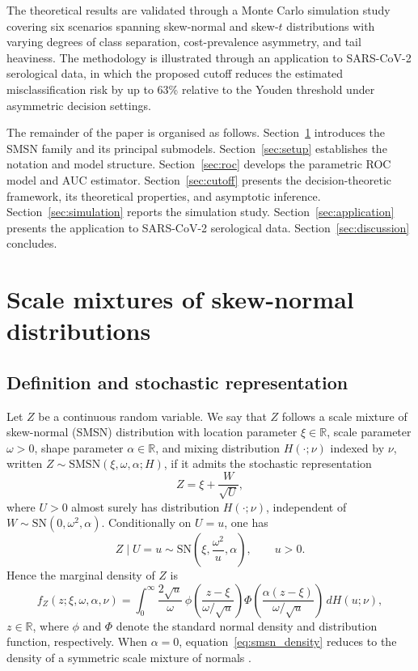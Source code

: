 \documentclass[11pt,a4paper]{article}
\theoremstyle{definition}
\theoremstyle{remark}
\newcommand{\1}{\mathbf{1}}
\begin{document}
\smallskip

The theoretical results are validated through a Monte Carlo simulation
study covering six scenarios spanning skew-normal and skew-$t$
distributions with varying degrees of class separation, cost-prevalence
asymmetry, and tail heaviness. The methodology is illustrated through an
application to SARS-CoV-2 serological data, in which the proposed
cutoff reduces the estimated misclassification risk by up to 63\%
relative to the Youden threshold under asymmetric decision settings.

The remainder of the paper is organised as follows.
Section~\ref{sec:smsn} introduces the SMSN family and its principal
submodels. Section~\ref{sec:setup} establishes the notation and model
structure. Section~\ref{sec:roc} develops the parametric ROC model and
AUC estimator. Section~\ref{sec:cutoff} presents the decision-theoretic
framework, its theoretical properties, and asymptotic inference.
Section~\ref{sec:simulation} reports the simulation study.
Section~\ref{sec:application} presents the application to SARS-CoV-2
serological data. Section~\ref{sec:discussion} concludes.

\section{Scale mixtures of skew-normal distributions}
\label{sec:smsn}

\subsection{Definition and stochastic representation}

Let $Z$ be a continuous random variable.
We say that $Z$ follows a scale mixture of skew-normal
(SMSN) distribution with location parameter $\xi \in \mathbb{R}$,
scale parameter $\omega > 0$, shape parameter $\alpha \in \mathbb{R}$,
and mixing distribution $H(\cdot;\nu)$ indexed by $\nu$,
written $Z \sim \mathrm{SMSN}(\xi,\omega,\alpha;H)$, if it admits the
stochastic representation
\[
Z=\xi+\frac{W}{\sqrt{U}},
\]
where $U>0$ almost surely has distribution $H(\cdot;\nu)$,
independent of $W \sim \mathrm{SN}(0,\omega^2,\alpha)$. Conditionally on $U=u$, one has
\[
Z \mid U=u \sim \mathrm{SN}\!\left(\xi,\frac{\omega^2}{u},\alpha\right),
\qquad u>0.
\]
Hence the marginal density of $Z$ is
\begin{equation}
\label{eq:smsn_density}
f_Z(z;\xi,\omega,\alpha,\nu)
=
\int_0^{\infty}
\frac{2\sqrt{u}}{\omega}\,
\phi\!\left(\frac{z-\xi}{\omega/\sqrt{u}}\right)
\Phi\!\left(\frac{\alpha(z-\xi)}{\omega/\sqrt{u}}\right)
\, dH(u;\nu),
\end{equation}
$z\in\mathbb{R}$, where $\phi$ and $\Phi$ denote the standard normal density and distribution function, respectively.
When $\alpha=0$, equation~\eqref{eq:smsn_density} reduces to the
density of a symmetric scale mixture of normals \citep{andrews1974scale}.
\end{document}
